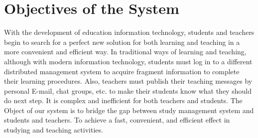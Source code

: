 \section{Objectives of the System}
With the development of education information technology, students and teachers begin to search for a perfect new solution for both learning and teaching in a more convenient and efficient way. In traditional ways of learning and teaching, although with modern information technology, students must log in to a different distributed management system to acquire fragment information to complete their learning procedures. Also, teachers must publish their teaching messages by personal E-mail, chat groups, etc. to make their students know what they should do next step. It is complex and inefficient for both teachers and students. The Object of our system is to bridge the gap between study management system and students and teachers. To achieve a fast, convenient, and efficient effect in studying and teaching activities.

